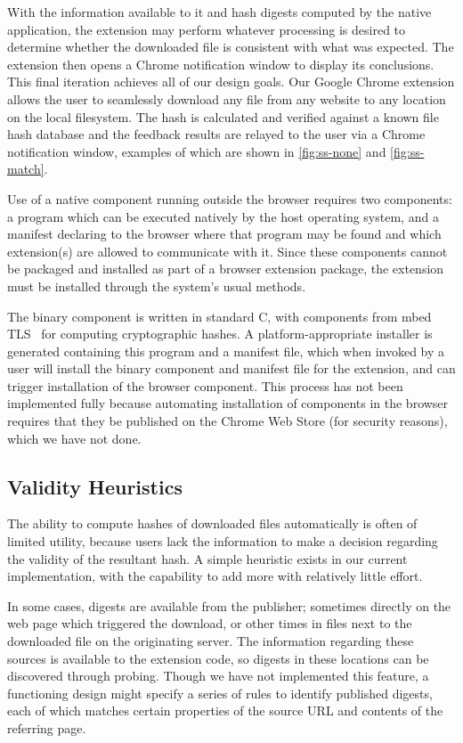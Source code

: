 \documentclass[letterpaper,twocolumn,10pt]{article}
\begin{document}
With the information available to it and hash digests computed by the native application,
the extension may perform whatever processing is desired to determine whether the
downloaded file is consistent with what was expected.
The extension then opens a Chrome notification window to display its conclusions.
This final iteration achieves all of our design goals. Our Google Chrome extension allows
the user to seamlessly download any file from any website to any location on the local
filesystem. The hash is calculated and verified against a known file hash database and
the feedback results are relayed to the user via a Chrome notification window, examples
of which are shown in \autoref{fig:ss-none} and \autoref{fig:ss-match}.

Use of a native component running outside the browser requires two components:
a program which can be executed natively by the host operating system, and a manifest
declaring to the browser where that program may be found and which extension(s) are
allowed to communicate with it. Since these components cannot be packaged and installed
as part of a browser extension package, the extension must be installed through the
system's usual methods.

The binary component is written in standard C, with components from mbed TLS~\cite{mbedtls}
for computing cryptographic hashes. A platform-appropriate installer is generated containing
this program and a manifest file, which when invoked by a user will install the binary component
and manifest file for the extension, and can trigger installation of the browser component.
This process has not been implemented fully because automating installation of components
in the browser requires that they be published on the Chrome Web Store (for security reasons),
which we have not done.

\subsection{Validity Heuristics}

The ability to compute hashes of downloaded files automatically is often of limited utility,
because users lack the information to make a decision regarding the validity of the
resultant hash. A simple heuristic exists in our current implementation, with the capability
to add more with relatively little effort.

In some cases, digests are available from the publisher; sometimes directly on the web page
which triggered the download, or other times in files next to the downloaded file on the
originating server. The information regarding these sources is available to the extension
code, so digests in these locations can be discovered through probing. Though we have not
implemented this feature, a functioning design might specify a series of rules to identify
published digests, each of which matches certain properties of the source URL and
contents of the referring page.
\end{document}
